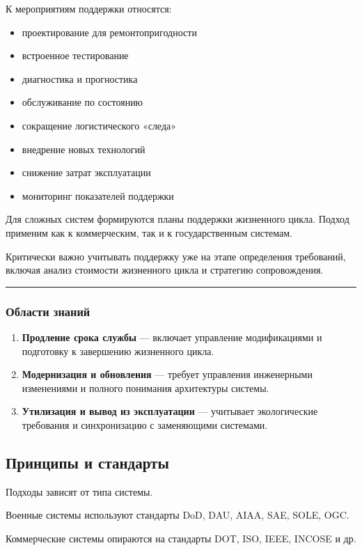 \documentclass[14pt,a4paper]{extarticle}
\begin{document}
К мероприятиям поддержки относятся:

\begin{itemize}
\item проектирование для ремонтопригодности
\item встроенное тестирование
\item диагностика и прогностика
\item обслуживание по состоянию
\item сокращение логистического «следа»
\item внедрение новых технологий
\item снижение затрат эксплуатации
\item мониторинг показателей поддержки
\end{itemize}

Для сложных систем формируются планы поддержки жизненного цикла. Подход применим как к коммерческим, так и к государственным системам.

Критически важно учитывать поддержку уже на этапе определения требований, включая анализ стоимости жизненного цикла и стратегию сопровождения.

\hrule

\subsubsection{Области знаний}

\begin{enumerate}
\item \textbf{Продление срока службы} — включает управление модификациями и подготовку к завершению жизненного цикла.
\item \textbf{Модернизация и обновления} — требует управления инженерными изменениями и полного понимания архитектуры системы.
\item \textbf{Утилизация и вывод из эксплуатации} — учитывает экологические требования и синхронизацию с заменяющими системами.
\end{enumerate}

\subsection{Принципы и стандарты}

Подходы зависят от типа системы.

Военные системы используют стандарты DoD, DAU, AIAA, SAE, SOLE, OGC.

Коммерческие системы опираются на стандарты DOT, ISO, IEEE, INCOSE и др.
\end{document}
